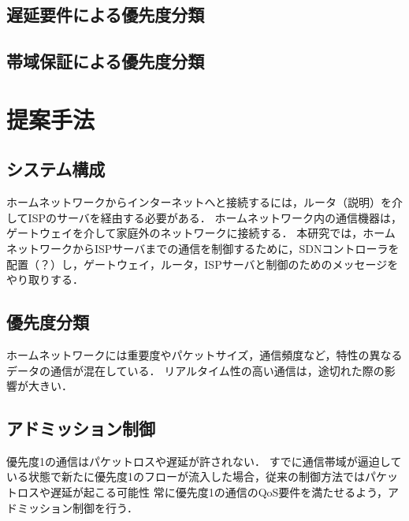 \documentclass[a4paper,11pt,uplatex]{ujreport}
\begin{document}
\section{遅延要件による優先度分類}
\label{sec:遅延要件による優先度分類}

\section{帯域保証による優先度分類}
\label{sec:帯域保証による優先度分類}

\chapter{提案手法}
\label{chap:提案手法}

\section{システム構成}
\label{sec:システム構成}

  ホームネットワークからインターネットへと接続するには，ルータ（説明）を介してISPのサーバを経由する必要がある．
  ホームネットワーク内の通信機器は，ゲートウェイを介して家庭外のネットワークに接続する．
  本研究では，ホームネットワークからISPサーバまでの通信を制御するために，SDNコントローラを配置（？）し，ゲートウェイ，ルータ，ISPサーバと制御のためのメッセージをやり取りする．

\section{優先度分類}
\label{sec:優先度分類}

  ホームネットワークには重要度やパケットサイズ，通信頻度など，特性の異なるデータの通信が混在している．
  リアルタイム性の高い通信は，途切れた際の影響が大きい．

\section{アドミッション制御}
\label{sec:アドミッション制御}

  優先度1の通信はパケットロスや遅延が許されない．
  すでに通信帯域が逼迫している状態で新たに優先度1のフローが流入した場合，従来の制御方法ではパケットロスや遅延が起こる可能性
  常に優先度1の通信のQoS要件を満たせるよう，アドミッション制御を行う．

\end{document}
